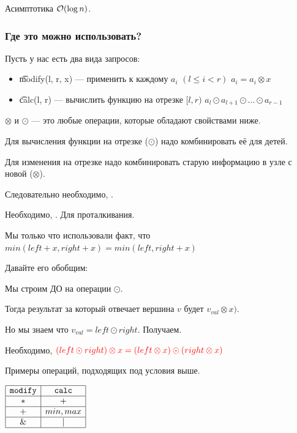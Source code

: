 Асимптотика $\mathcal{O}(\log n)$.

\subsubsection{Где это можно использовать?}

Пусть у нас есть два вида запросов:

\begin{itemize}
	\item \t{modify(l, r, x)} --- применить к каждому $a_i$ $(l \le i < r)$ $a_i = a_i \otimes x$
	\item \t{calc(l, r)} --- вычислить функцию на отрезке $[l, r)$ $a_l \odot a_{l + 1} \odot \ldots \odot a_{r - 1}$
\end{itemize}

$\otimes$ и $\odot$ — это любые операции, которые обладают свойствами ниже.
\down

Для вычисления функции на отрезке ($\odot$) надо комбинировать её для детей.

Для изменения на отрезке надо комбинировать старую информацию в узле с новой ($\otimes$).

Следовательно необходимо, .
\down

Необходимо, . Для проталкивания.
\down

Мы только что использовали факт, что $min(left + x, right + x) = min(left, right + x)$

Давайте его обобщим:

Мы строим ДО на операции $\odot$.

Тогда результат за который отвечает вершина $v$ будет $v_{val} \otimes x)$.

Но мы знаем что $v_{val} = left \odot right$. Получаем.

Необходимо, ${\color{red}{(left \odot right) \otimes x = (left \otimes x) \odot (right \otimes x)}}$
\down

Примеры операций, подходящих под условия выше.

\begin{center}
	$\begin{array}{| c | c |} \hline \texttt{modify} & \texttt{calc} \\ \hline * & + \\ \hline + & min, max \\ \hline \& & | \\ \hline \end{array}$
\end{center}

